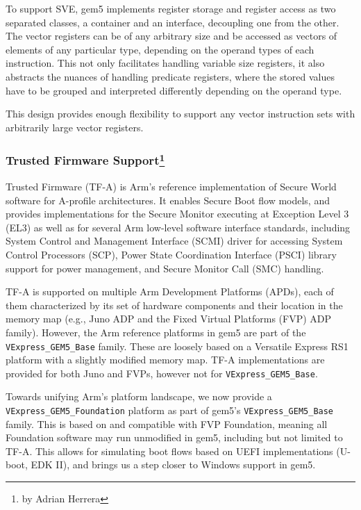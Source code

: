 To support SVE, gem5 implements register storage and register access
as two separated classes, a container and an interface, decoupling one from the
other. The vector registers can be of any arbitrary size and be accessed as
vectors of elements of any particular type, depending on the operand types of
each instruction. This not only facilitates handling variable size registers,
it also abstracts the nuances of handling predicate registers, where the stored
values have to be grouped and interpreted differently depending on the operand
type.

This design provides enough flexibility to support any vector instruction sets
with arbitrarily large vector registers.

\subsubsection[Trusted Firmware Support]{Trusted Firmware Support\footnote{by Adrian Herrera}}

Trusted Firmware (TF-A) is Arm's reference implementation of Secure World software for A-profile architectures.
It enables Secure Boot flow models, and provides implementations for the Secure Monitor executing at Exception Level 3 (EL3) as well as for several Arm low-level software interface standards, including System Control and Management Interface (SCMI) driver for accessing System Control Processors (SCP), Power State Coordination Interface (PSCI) library support for power management, and Secure Monitor Call (SMC) handling.

TF-A is supported on multiple Arm Development Platforms (APDs), each of them characterized by its set of hardware components and their location in the memory map (e.g., Juno ADP and the Fixed Virtual Platforms (FVP) ADP family).
However, the Arm reference platforms in gem5 are part of the \verb|VExpress_GEM5_Base| family.
These are loosely based on a Versatile Express RS1 platform with a slightly modified memory map. TF-A implementations are provided for both Juno and FVPs, however not for \verb|VExpress_GEM5_Base|.

Towards unifying Arm's platform landscape, we now provide a \verb|VExpress_GEM5_Foundation| platform as part of gem5's \verb|VExpress_GEM5_Base| family.
This is based on and compatible with FVP Foundation, meaning all Foundation software may run unmodified in gem5, including but not limited to TF-A.
This allows for simulating boot flows based on UEFI implementations (U-boot, EDK II), and brings us a step closer to Windows support in gem5.

